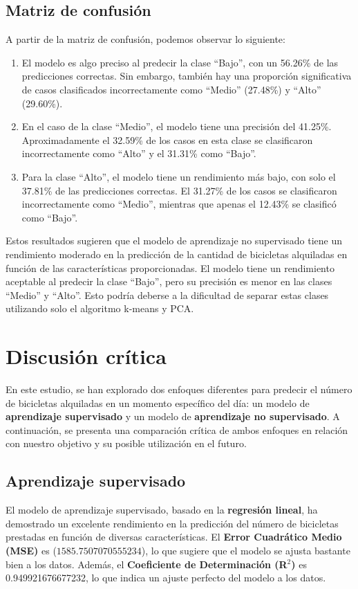 \documentclass{wsdcr}
\begin{document}
\subsection{Matriz de confusión}
A partir de la matriz de confusión, podemos observar lo siguiente:
\begin{enumerate}
    \item El modelo es algo preciso al predecir la clase ``Bajo'', con un 56.26\% de las predicciones correctas. Sin embargo, también hay una proporción significativa de casos clasificados incorrectamente como ``Medio'' (27.48\%) y ``Alto'' (29.60\%).
    \item En el caso de la clase ``Medio'', el modelo tiene una precisión del 41.25\%. Aproximadamente el 32.59\% de los casos en esta clase se clasificaron incorrectamente como ``Alto'' y el 31.31\% como ``Bajo''.
    \item Para la clase ``Alto'', el modelo tiene un rendimiento más bajo, con solo el 37.81\% de las predicciones correctas. El 31.27\% de los casos se clasificaron incorrectamente como ``Medio'', mientras que apenas el 12.43\% se clasificó como ``Bajo''.
\end{enumerate}
Estos resultados sugieren que el modelo de aprendizaje no supervisado tiene un rendimiento moderado en la predicción de la cantidad de bicicletas alquiladas en función de las características proporcionadas. El modelo tiene un rendimiento aceptable al predecir la clase ``Bajo'', pero su precisión es menor en las clases ``Medio'' y ``Alto''. Esto podría deberse a la dificultad de separar estas clases utilizando solo el algoritmo k-means y PCA.

\section{Discusión crítica}

En este estudio, se han explorado dos enfoques diferentes para predecir el número de bicicletas alquiladas en un momento específico del día: un modelo de \textbf{aprendizaje supervisado} y un modelo de \textbf{aprendizaje no supervisado}. A continuación, se presenta una comparación crítica de ambos enfoques en relación con nuestro objetivo y su posible utilización en el futuro.

\subsection{Aprendizaje supervisado}

El modelo de aprendizaje supervisado, basado en la \textbf{regresión lineal}, ha demostrado un excelente rendimiento en la predicción del número de bicicletas prestadas en función de diversas características. El \textbf{Error Cuadrático Medio (MSE)} es ($1585.7507070555234$), lo que sugiere que el modelo se ajusta bastante bien a los datos. Además, el \textbf{Coeficiente de Determinación (R$^2$)} es 0.949921676677232, lo que indica un ajuste perfecto del modelo a los datos.
\end{document}
